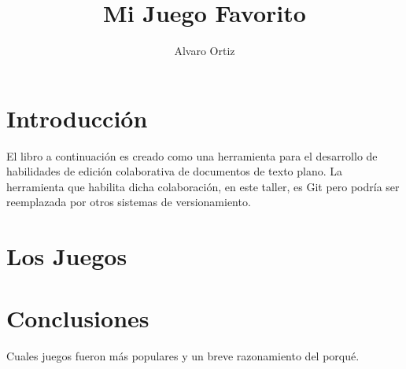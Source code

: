 \documentclass[12pt,oneside]{book}
\title{Mi Juego Favorito}
\author{Alvaro Ortiz}
\begin{document}
\maketitle
\tableofcontents

\chapter{Introducción}
El libro a continuación es creado como una herramienta para el desarrollo de habilidades de edición colaborativa de documentos de texto plano. La herramienta que habilita dicha colaboración, en este taller, es Git pero podría ser reemplazada por otros sistemas de versionamiento.

\chapter{Los Juegos}




\chapter{Conclusiones}
Cuales juegos fueron más populares y un breve razonamiento del porqué.
\end{document}
